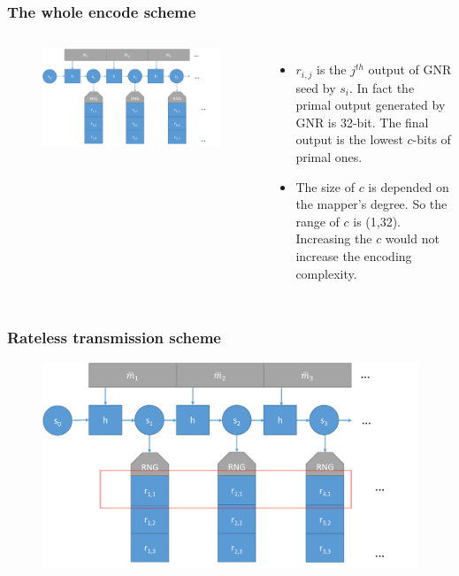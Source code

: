 \documentclass{beamer}
\begin{document}
\begin{frame}
\frametitle{The whole encode scheme}
\begin{columns}
\begin{figure}
\includegraphics[width=.99\textwidth]{Spinalcode3.pdf}
\end{figure}
\begin{itemize}
\item $r_{i,j}$ is the $j^{th}$ output of GNR seed by $s_i$. In fact the primal output generated by GNR is 32-bit. The final output is the lowest $c$-bits of primal ones.

\item The size of $c$ is depended on the mapper's degree. So the range of $c$ is (1,32). Increasing the $c$ would not increase the encoding complexity.
\end{itemize}
\end{columns}
\end{frame}
\begin{frame}
\frametitle{Rateless transmission scheme}
\begin{figure}
\includegraphics[width=.99\textwidth]{Spinalcode4.pdf}
\end{figure}
\end{frame}
\end{document}

